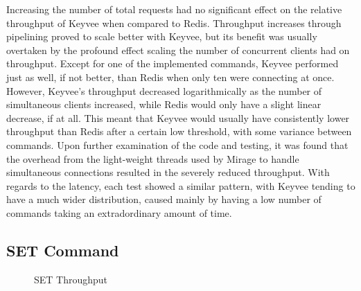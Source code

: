 \documentclass[english,10pt,twocolumn]{article}
\begin{document}
Increasing the number of total requests had no significant effect on the relative throughput of Keyvee when compared to Redis.
Throughput increases through pipelining proved to scale better with Keyvee, but its benefit was usually overtaken by the profound effect scaling the number of concurrent clients had on throughput.
Except for one of the implemented commands, Keyvee performed just as well, if not better, than Redis when only ten were connecting at once.
However, Keyvee's throughput decreased logarithmically as the number of simultaneous clients increased, while Redis would only have a slight linear decrease, if at all.
This meant that Keyvee would usually have consistently lower throughput than Redis after a certain low threshold, with some variance between commands.
Upon further examination of the code and testing, it was found that the overhead from the light-weight threads used by Mirage to handle simultaneous connections resulted in the severely reduced throughput.
With regards to the latency, each test showed a similar pattern, with Keyvee tending to have a much wider distribution, caused mainly by having a low number of commands taking an extradordinary amount of time.

\subsection{SET Command}

\begin{figure}[!htb]
\caption{SET Throughput\label{fig:SET_T}}
\end{figure}
\end{document}
